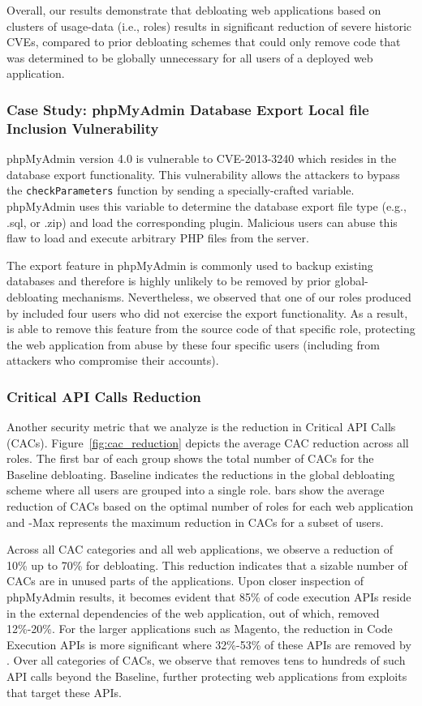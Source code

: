 Overall, our results demonstrate that debloating web applications based on clusters of usage-data (i.e., roles) results in significant reduction of severe historic CVEs, compared to prior debloating schemes that could only remove code that was determined to be globally unnecessary for all users of a deployed web application.

\subsubsection{Case Study: phpMyAdmin Database Export Local file Inclusion Vulnerability}

phpMyAdmin version 4.0 is vulnerable to CVE-2013-3240 which resides in the database export functionality. 
This vulnerability allows the attackers to bypass the \texttt{checkParameters} function by sending a specially-crafted variable. 
phpMyAdmin uses this variable to determine the database export file type (e.g., .sql, or .zip) and load the corresponding plugin. 
Malicious users can abuse this flaw to load and execute arbitrary PHP files from the server. 

The export feature in phpMyAdmin is commonly used to backup existing databases and therefore is highly unlikely to be removed by prior global-debloating mechanisms.
Nevertheless, we observed that one of our roles produced by \dbltr{} included four users who did not exercise the export functionality. As a result, \dbltr{} is able to remove this feature from the source code of that specific role, protecting the web application from abuse by these four specific users (including from attackers who compromise their accounts). 

\subsubsection{Critical API Calls Reduction}

Another security metric that we analyze is the reduction in Critical API Calls (CACs). 
Figure~\ref{fig:cac_reduction} depicts the average CAC reduction across all roles. 
The first bar of each group shows the total number of CACs for the Baseline debloating. 
Baseline indicates the reductions in the global debloating scheme where all users are grouped into a single role. 
\dbltr{} bars show the average reduction of CACs based on the optimal number of roles for each web application and \dbltr{}-Max represents the maximum reduction in CACs for a subset of users. 

Across all CAC categories and all web applications, we observe a reduction of 10\% up to 70\% for \dbltr{} debloating. 
This reduction indicates that a sizable number of CACs are in unused parts of the applications. Upon closer inspection of phpMyAdmin results, it becomes evident that 85\% of code execution APIs reside in the external dependencies of the web application, out of which, \dbltr{} removed 12\%-20\%. 
For the larger applications such as Magento, the reduction in Code Execution APIs is more significant where 32\%-53\% of these APIs are removed by \dbltr{}.
Over all categories of CACs, we observe that \dbltr{} removes tens to hundreds of such API calls beyond the Baseline, further protecting web applications from exploits that target these APIs. 

